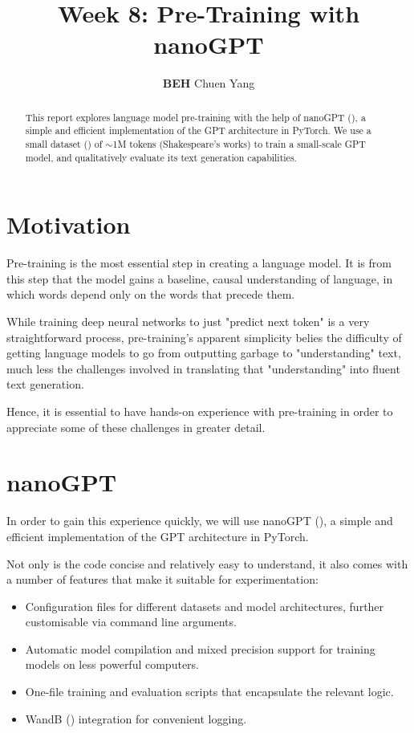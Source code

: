 \documentclass{article} %
\title{Week 8: Pre-Training with nanoGPT}
\author{\textbf{BEH} Chuen Yang}
\theoremstyle{definition}
\begin{document}
\ifcolmsubmission
\linenumbers
\fi

\maketitle

\begin{abstract}
    This report explores language model pre-training with the help
    of nanoGPT (\cite{nanoGPT}), a simple and efficient implementation of the GPT architecture
    in PyTorch. We use a small dataset (\cite{tinyss}) of $\sim$1M tokens (Shakespeare's works)
    to train a small-scale GPT model, and qualitatively evaluate its
    text generation capabilities.
\end{abstract}

\section{Motivation}
Pre-training is the most essential step in creating a language model.
It is from this step that the model gains a baseline, causal understanding of language,
in which words depend only on the words that precede them.

While training deep neural networks to just "predict next token" is a very straightforward process,
pre-training's apparent simplicity belies the difficulty of getting language models to go from
outputting garbage to "understanding" text, much less the challenges involved in translating that
"understanding" into fluent text generation.

Hence, it is essential to have hands-on experience with pre-training in order to appreciate
some of these challenges in greater detail. 

\section{nanoGPT}
In order to gain this experience quickly, we will use nanoGPT (\cite{nanoGPT}), a simple and efficient 
implementation of the GPT architecture in PyTorch.

Not only is the code concise and relatively easy to understand, it also
comes with a number of features that make it suitable for experimentation:
\begin{itemize}
    \item Configuration files for different datasets and model architectures, 
        further customisable via command line arguments.
    \item Automatic model compilation and mixed precision support
        for training models on less powerful computers.
    \item One-file training and evaluation scripts that encapsulate the relevant logic.
    \item WandB (\cite{wandb}) integration for convenient logging.
\end{itemize}
\end{document}

